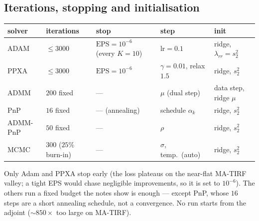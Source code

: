 \subsection{Iterations, stopping and initialisation}
\begin{center}
\begin{tabular}{lllll}
\toprule
solver & iterations & stop & step & init \\
\midrule
ADAM     & $\le 3000$ & $\text{EPS}=10^{-6}$ (every $K{=}10$) & $\text{lr}=0.1$ & ridge, $\lambda_{rr}=s_2^2$ \\
PPXA     & $\le 3000$ & $\text{EPS}=10^{-6}$ & $\gamma=0.01$, relax $1.5$ & ridge, $s_2^2$ \\
ADMM     & $200$ fixed & --- & $\mu$ (dual step) & data step, ridge $\mu$ \\
PnP      & $16$ fixed & --- (annealing) & schedule $\alpha_k$ & ridge, $s_2^2$ \\
ADMM-PnP & $50$ fixed & --- & $\rho$ & ridge, $s_2^2$ \\
MCMC     & $300$ ($25\%$ burn-in) & --- & $\sigma$, temp.\ (auto) & ridge, $s_2^2$ \\
\bottomrule
\end{tabular}
\end{center}
Only Adam and PPXA stop early (the loss plateaus on the near-flat MA-TIRF valley; a tight EPS
would chase negligible improvements, so it is set to $10^{-6}$). The others run a fixed budget
the notes show is enough --- except PnP, whose $16$ steps are a short annealing schedule, not a
convergence. No run starts from the adjoint (${\sim}850\times$ too large on MA-TIRF).

